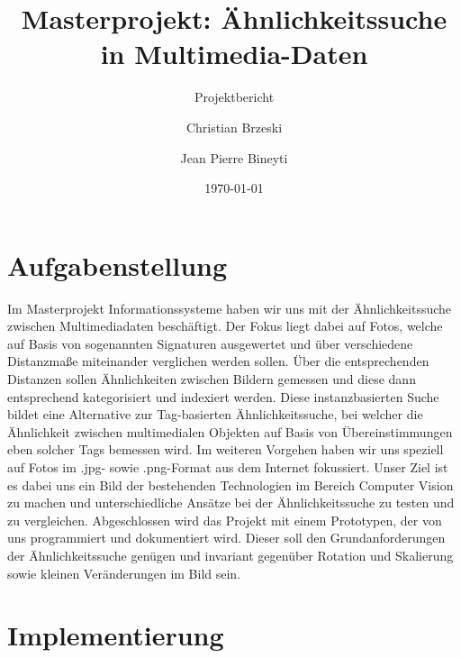 \documentclass{scrartcl}
\title{Masterprojekt: Ähnlichkeitssuche in Multimedia-Daten}
\subtitle{Projektbericht}
\author{Christian Brzeski \and Jean Pierre Bineyti}
\date{\today}
\begin{document}
\maketitle

\section{Aufgabenstellung}
Im Masterprojekt Informationssysteme haben wir uns mit der Ähnlichkeitssuche zwischen Multimediadaten beschäftigt. Der Fokus liegt dabei auf Fotos, welche auf Basis von sogenannten Signaturen ausgewertet und über verschiedene Distanzmaße miteinander verglichen werden sollen. Über die entsprechenden Distanzen sollen Ähnlichkeiten zwischen Bildern gemessen und  diese dann entsprechend kategorisiert und indexiert werden. Diese instanzbasierten Suche bildet eine Alternative zur Tag-basierten Ähnlichkeitssuche, bei welcher die Ähnlichkeit zwischen multimedialen Objekten auf Basis von Übereinstimmungen eben solcher Tags bemessen wird. Im weiteren Vorgehen haben wir uns speziell auf Fotos im .jpg- sowie .png-Format aus dem Internet fokussiert. Unser Ziel ist es dabei uns ein Bild der bestehenden Technologien im Bereich Computer Vision zu machen und unterschiedliche Ansätze bei der Ähnlichkeitssuche zu testen und zu vergleichen. Abgeschlossen wird das Projekt mit einem Prototypen, der von uns programmiert und dokumentiert wird. Dieser soll den Grundanforderungen der Ähnlichkeitssuche genügen und invariant gegenüber Rotation und Skalierung sowie kleinen Veränderungen im Bild sein.

\section{Implementierung}
\end{document}
